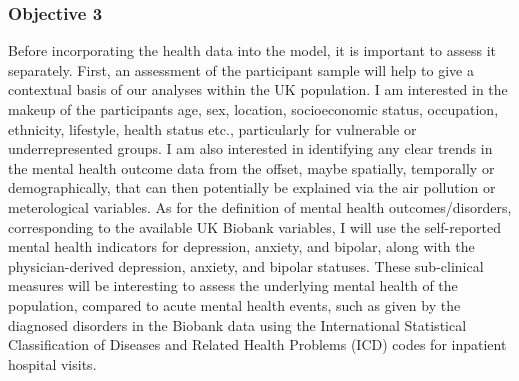 \subsubsection{Objective 3} 
Before incorporating the health data into the model, it is important to assess it separately. First, an assessment of the participant sample will help to give a contextual basis of our analyses within the UK population. I am interested in the makeup of the participants age, sex, location, socioeconomic status, occupation, ethnicity, lifestyle, health status etc., particularly for vulnerable or underrepresented groups. I am also interested in identifying any clear trends in the mental health outcome data from the offset, maybe spatially, temporally or demographically, that can then potentially be explained via the air pollution or meterological variables. As for the definition of mental health outcomes/disorders, corresponding to the available UK Biobank variables, I will use the self-reported mental health indicators for depression, anxiety, and bipolar, along with the physician-derived depression, anxiety, and bipolar statuses. These sub-clinical measures will be interesting to assess the underlying mental health of the population, compared to acute mental health events, such as given by the diagnosed disorders in the Biobank data using the International Statistical Classification of Diseases and Related Health Problems (ICD) codes \citep{WorldHealthOrganisationICD-10Version:2019} for inpatient hospital visits.

